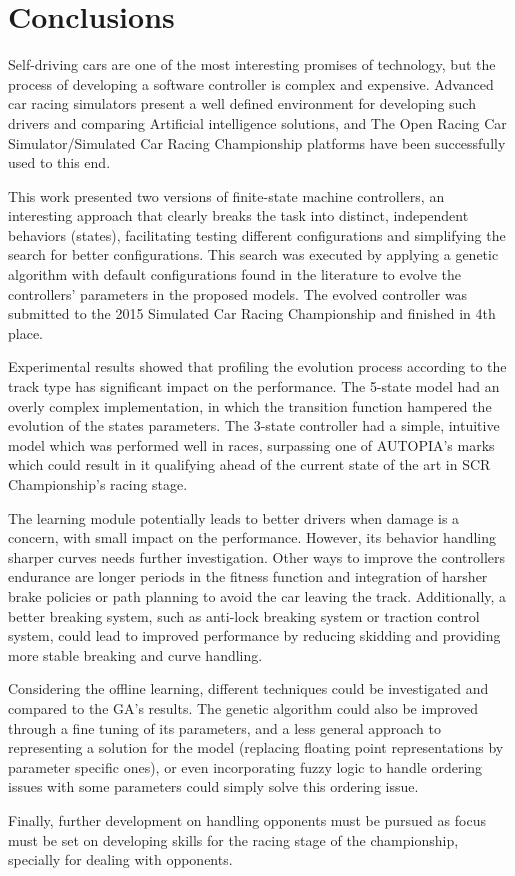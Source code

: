 \section{Conclusions}\label{sec:5}
Self-driving cars are one of the most interesting promises of technology, but the process of developing a software controller is complex and expensive. Advanced car racing simulators present a well defined environment for developing such drivers and comparing Artificial intelligence solutions, and The Open Racing Car Simulator/Simulated Car Racing Championship platforms have been successfully used to this end.

This work presented two versions of finite-state machine controllers, an interesting approach that clearly breaks the task into distinct, independent behaviors (states), facilitating testing different configurations and simplifying the search for better configurations. This search was executed by applying a genetic algorithm with default configurations found in the literature to evolve the controllers' parameters in the proposed models. The evolved controller was submitted to the 2015 Simulated Car Racing Championship and finished in 4th place.

Experimental results showed that profiling the evolution process according to the track type has significant impact on the performance. The 5-state model had an overly complex implementation, in which the transition function hampered the evolution of the states parameters. The 3-state controller had a simple, intuitive model which was performed well in races, surpassing one of AUTOPIA's marks which could result in it qualifying ahead of the current state of the art in SCR Championship's racing stage.

The learning module potentially leads to better drivers when damage is a concern, with small impact on the performance. However, its behavior handling sharper curves needs further investigation. Other ways to improve the controllers endurance are longer periods in the fitness function and integration of harsher brake policies or path planning to avoid the car leaving the track. Additionally, a better breaking system, such as anti-lock breaking system or traction control system, could lead to improved performance by reducing skidding and providing more stable breaking and curve handling.

Considering the offline learning, different techniques could be investigated and compared to the GA's results. The genetic algorithm could also be improved through a fine tuning of its parameters, and a less general approach to representing a solution for the model (replacing floating point representations by parameter specific ones), or even incorporating fuzzy logic to handle ordering issues with some parameters could simply solve this ordering issue.

Finally, further development on handling opponents must be pursued as focus must be set on developing skills for the racing stage of the championship, specially for dealing with opponents.